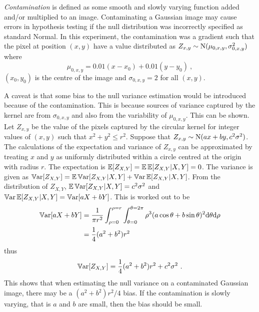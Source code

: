 \emph{Contamination} is defined as some smooth and slowly varying function added and/or multiplied to an image. Contaminating a Gaussian image may cause errors in hypothesis testing if the null distribution was incorrectly specified as standard Normal. In this experiment, the contamination was a gradient such that the pixel at position $(x,y)$ have a value distributed as $Z_{x,y}\sim\operatorname{N}(\mu_{0,x,y},\sigma_{0,x,y}^2)$ where
\begin{equation}
  \mu_{0,x,y} = 0.01 (x-x_0) + 0.01 (y-y_0) \ ,
\end{equation}
$(x_0,y_0)$ is the centre of the image and $\sigma_{0,x,y}=2$ for all $(x,y)$.

A caveat is that some bias to the null variance estimation would be introduced because of the contamination. This is because sources of variance captured by the kernel are from $\sigma_{0,x,y}$ and also from the variability of $\mu_{0,x,y}$. This can be shown. Let $Z_{x,y}$ be the value of the pixels captured by the circular kernel for integer values of $(x,y)$ such that $x^2+y^2\leqslant r^2$. Suppose that $Z_{x,y}\sim\operatorname{N}(ax+by,c^2\sigma^2)$. The calculations of the expectation and variance of $Z_{x,y}$ can be approximated by treating $x$ and $y$ as uniformly distributed within a circle centred at the origin with radius $r$. The expectation is $\operatorname{\mathbb{E}}[Z_{X,Y}] = \operatorname{\mathbb{E}}\operatorname{\mathbb{E}}[Z_{X,Y}|X,Y]=0$. The variance is given as $\operatorname{\mathbb{V}ar}[Z_{X,Y}] = \operatorname{\mathbb{E}}\operatorname{\mathbb{V}ar}[Z_{X,Y}|X,Y] + \operatorname{\mathbb{V}ar}\operatorname{\mathbb{E}}[Z_{X,Y}|X,Y]$. From the distribution of $Z_{X,Y}$, $\operatorname{\mathbb{E}}\operatorname{\mathbb{V}ar}[Z_{X,Y}|X,Y] = c^2\sigma^2$ and $\operatorname{\mathbb{V}ar}\operatorname{\mathbb{E}}[Z_{X,Y}|X,Y]=\operatorname{\mathbb{V}ar}[aX+bY]$. This is worked out to be
\begin{align}
\operatorname{\mathbb{V}ar}[aX+bY] &= \dfrac{1}{\pi r^2}\int_{\rho=0}^{\rho=r}\int_{\theta=0}^{\theta=2\pi}
\rho^3(a\cos\theta + b\sin\theta)^2 \mathrm{d} \theta \mathrm{d} \rho
\nonumber\\
& = \dfrac{1}{4}(a^2+b^2)r^2
\end{align}
thus
\begin{equation}
\operatorname{\mathbb{V}ar}[Z_{X,Y}] = \dfrac{1}{4}(a^2+b^2)r^2 + c^2\sigma^2 \ .
\end{equation}
This shows that when estimating the null variance on a contaminated Gaussian image, there may be a $(a^2+b^2)r^2/4$ bias. If the contamination is slowly varying, that is $a$ and $b$ are small, then the bias should be small.

